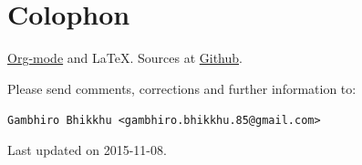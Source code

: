 \documentclass[11pt,oneside]{memoir-article}
\begin{document}
\chapter{Colophon}
\label{sec-9}

\href{http://orgmode.org/}{Org-mode} and \LaTeX. Sources at \href{https://github.com/profound-labs/calculating-the-uposatha-moondays/}{Github}.

Please send comments, corrections and further information to:

\texttt{Gambhiro Bhikkhu <gambhiro.bhikkhu.85@gmail.com>}

Last updated on 2015-11-08.





\end{document}

